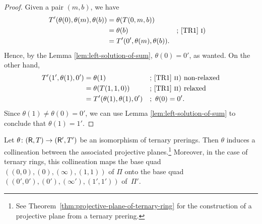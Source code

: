 \begin{proof}
    Given a pair $(m,b)$, we have
    \begin{align*}
        T'(\theta(0),\theta(m),\theta(b)) &= \theta(T(0,m,b))\\
            &=\theta(b) 
                &&\text{; \ref{TR1} \textsc i)}\\
            &= T'(0',\theta(m),\theta(b)).
    \end{align*}
    Hence, by the Lemma \ref{lem:left-solution-of-sum}, $\theta(0)=0'$, as wanted. On the other hand,
    \begin{align*}
        T'(1',\theta(1),0') &= \theta(1)
                &&\text{; \ref{TR1} \textsc{ii)} non-relaxed}\\
            &= \theta(T(1,1,0))
                &&\text{; \ref{TR1} \textsc{ii)} relaxed}\\
            &= T'(\theta(1),\theta(1),0')
                &&;\ \theta(0)=0'.
    \end{align*}
    Since $\theta(1)\ne\theta(0)=0'$, we can use Lemma \ref{lem:left-solution-of-sum} to conclude that $\theta(1)=1'$.
\end{proof}

\begin{prop}\label{prop:coorinatized-isomorphism}
    Let\/ $\theta\colon (\mathsf R,T)\to(\mathsf R',T')$ be an isomorphism of ternary prerings. Then\/ $\theta$ induces a collineation between the associated projective planes.\footnote{See {\upshape Theorem~\ref{thm:projective-plane-of-ternary-ring}} for the construction of a projective plane from a ternary prering.} Moreover, in the case of ternary rings, this collineation maps the base quad\/ $((0,0),(0),(\infty),(1,1))$ of\/ $\Pi$ onto the base quad\/ $((0',0'),(0'),(\infty'),(1',1'))$ of\/~$\Pi'$.
\end{prop}


